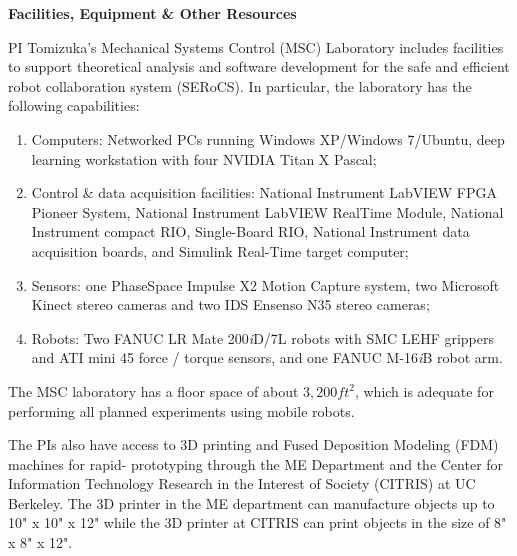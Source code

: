 
\setcounter{page}{1}

\begin{center}
\textbf{\large Facilities, Equipment \& Other Resources}
\end{center}


% 
% 

PI Tomizuka's Mechanical Systems Control (MSC) Laboratory includes facilities to support theoretical analysis and software development for the safe and efficient robot collaboration system (SERoCS). In particular, the laboratory has the following capabilities:

\begin{enumerate}
\item Computers: Networked PCs running Windows XP/Windows 7/Ubuntu, deep learning workstation with four NVIDIA Titan X Pascal;
\item Control \& data acquisition facilities: National Instrument LabVIEW FPGA Pioneer System, National Instrument LabVIEW RealTime Module, National Instrument compact RIO, Single-Board RIO, National Instrument data acquisition boards, and Simulink Real-Time target computer;
\item Sensors: one PhaseSpace Impulse X2 Motion Capture system, two Microsoft Kinect stereo cameras and two IDS Ensenso N35 stereo cameras;
\item Robots: Two FANUC LR Mate 200\textit{i}D/7L robots with SMC LEHF grippers and ATI mini 45 force / torque sensors, and one FANUC M-16\textit{i}B robot arm.
\end{enumerate}

The MSC laboratory has a floor space of about $3,200 ft^2$, which is adequate for performing all planned experiments using mobile robots.

The PIs also have access to 3D printing and Fused Deposition Modeling (FDM) machines for rapid- prototyping through the ME Department and the Center for Information Technology Research in the Interest of Society (CITRIS) at UC Berkeley. The 3D printer in the ME department can manufacture objects up to 10" x 10" x 12" while the 3D printer at CITRIS can print objects in the size of 8" x 8" x 12".

